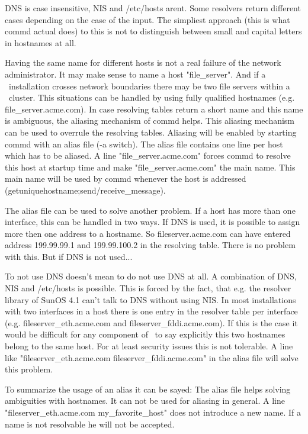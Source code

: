 DNS is case insensitive, NIS and /etc/hosts arent. Some resolvers return
different cases depending on the case of the input. The simpliest approach
(this is what commd actual does) to this is not to distinguish between small 
and capital letters in hostnames at all. 
\medskip

Having the same name for different hosts is not a real failure of the network 
administrator. It may make sense to name a host "file\_server". And if a \C\ 
installation crosses network boundaries there may be two file servers within
a \C\ cluster. This situations can be handled by using fully qualified
hostnames (e.g. file\_server.acme.com). In case resolving tables return a short
name and this name is ambiguous, the aliasing mechanism of commd helps.
This aliasing mechanism can be used to overrule the resolving tables.
Aliasing will be enabled by starting commd with an alias file (-a switch).
The alias file contains one line per host which has to be aliased. A
line "file\_server.acme.com" forces commd to resolve this host at startup time
and make "file\_server.acme.com" the main name. This main name will be used
by commd whenever the host is addressed 
(getuniquehostname;send/receive\_message).
\medskip

The alias file can be used to solve another problem. If a host has more than
one interface, this can be handled in two ways. If DNS is used, it is possible
to assign more then one address to a hostname. So fileserver.acme.com can
have entered address 199.99.99.1 and 199.99.100.2 in the resolving table.
There is no problem with this. But if DNS is not used...

To not use DNS doesn't mean to do not use DNS at all. A combination of DNS,
NIS and /etc/hosts is possible. This is forced by the fact, that e.g. the
resolver library of SunOS 4.1 can't talk to DNS without using NIS.
In most installations with two interfaces in a host there is one entry in the
resolver table per interface (e.g. fileserver\_eth.acme.com and 
fileserver\_fddi.acme.com). If this is the case it would be difficult for any
component of \C\ to say explicitly this two hostnames belong to the same
host. For at least security issues this is not tolerable. A line like
"fileserver\_eth.acme.com fileserver\_fddi.acme.com" in the alias file will
solve this problem.
\medskip

To summarize the usage of an alias it can be sayed: The alias file helps
solving ambiguities with hostnames. It can not be used for aliasing in general.
A line "fileserver\_eth.acme.com my\_favorite\_host" does not introduce a
new name. If a name is not resolvable he will not be accepted.
\medskip

